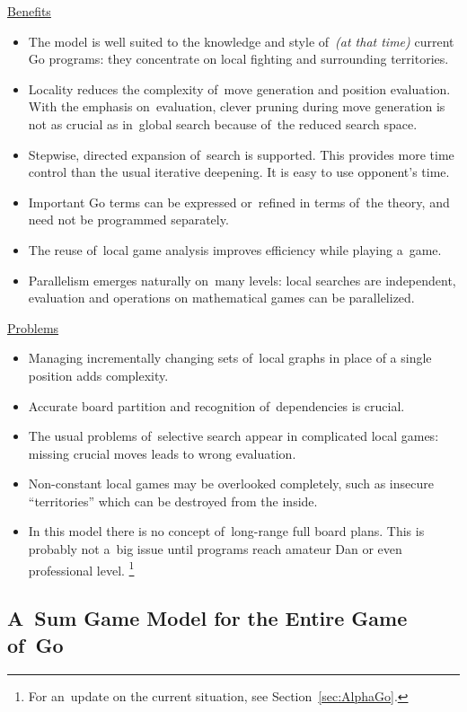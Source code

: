 \underline{Benefits}
\begin{itemize}[+]
  \item The model is well suited to the knowledge and style of~\textit{(at that time)} current Go programs:
    they concentrate on local fighting and surrounding territories.
  \item Locality reduces the complexity of~move generation and position evaluation.
    With the emphasis on~evaluation, clever pruning during move generation is not as crucial as in~global search because of~the reduced search space.
  \item Stepwise, directed expansion of~search is supported.
    This provides more time control than the usual iterative deepening.
    It is easy to use opponent's time.
  \item Important Go terms can be expressed or~refined in terms of~the theory, and need not be programmed separately.
  \item The reuse of~local game analysis improves efficiency while playing a~game.
  \item Parallelism emerges naturally on~many levels: local searches are independent, evaluation and operations on mathematical games can be parallelized.
\end{itemize}

\underline{Problems}
\begin{itemize}[-]
  \item Managing incrementally changing sets of~local graphs in place of a single position adds complexity.
  \item Accurate board partition and recognition of~dependencies is crucial.
  \item The usual problems of~selective search appear in complicated local games:
    missing crucial moves leads to wrong evaluation.
  \item Non-constant local games may be overlooked completely, such as insecure ``territories'' which can be destroyed from the inside.
  \item In this model there is no concept of~long-range full board plans.
    This is probably not a~big issue until programs reach amateur Dan or even professional level.%
    \footnote{For an~update on the current situation, see Section~\ref{sec:AlphaGo}.}
\end{itemize}

\subsection{A~Sum Game Model for the Entire Game of~Go}

